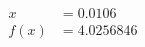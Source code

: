 \documentclass[preview]{standalone}
\begin{document}
\begin{align*}
x &= 0.0106\\f(x) &= 4.0256846
\end{align*}
\end{document}

